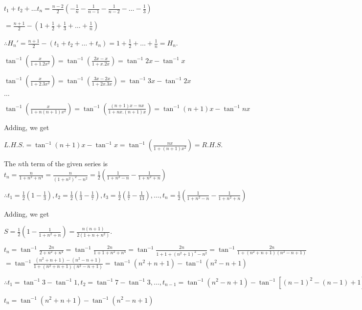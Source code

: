   $t_1 + t_2 + \ldots t_n = \frac{n - 2}{2}\left(-\frac{1}{n} - \frac{1}{n - 1} -\frac{1}{n - 2} -\ldots
  -\frac{1}{3}\right)$

  $= \frac{n + 1}{2} - \left(1 + \frac{1}{2} + \frac{1}{3} + \ldots + \frac{1}{n}\right)$

  $\therefore H_n' = \frac{n + 1}{2} - (t_1 + t_2 + \ldots + t_n) = 1 + \frac{1}{2} + \ldots + \frac{1}{n} =
  H_n$.
\item $\tan^{-1}\left(\frac{x}{1 + 1.2x^2}\right) = \tan^{-1}\left(\frac{2x - x}{1 + x. 2x}\right) =
  \tan^{-1}2x - \tan^{-1}x$

  $\tan^{-1}\left(\frac{x}{1 + 2.3x^2}\right) = \tan^{-1}\left(\frac{3x - 2x}{1 + 2x.3x}\right) =
  \tan^{-1}3x - \tan^{-1}2x$

  $\ldots$

  $\tan^{-1}\left(\frac{x}{1 + n(n + 1)x^2}\right) = \tan^{-1}\left(\frac{(n + 1)x - nx}{1 + nx.(n +
    1)x}\right) = \tan^{-1}(n + 1)x - \tan^{-1}nx$

  Adding, we get

  $L.H.S. = \tan^{-1}(n + 1)x - \tan^{-1}x = \tan^{-1}\left(\frac{nx}{1 + (n + 1)x^2}\right) = R.H.S.$
\item The $n$th term of the given series is
  $t_n = \frac{n}{1 + n^2 + n^4} = \frac{n}{(1 + n^2)^2 - n^2} = \frac{1}{2}\left(\frac{1}{1 + n^2 - n} -
  \frac{1}{1 + n^2 + n}\right)$

  $\therefore t_1 = \frac{1}{2}\left(1 - \frac{1}{3}\right), t_2 = \frac{1}{2}\left(\frac{1}{3} -
  \frac{1}{7}\right), t_3 = \frac{1}{2}\left(\frac{1}{7} - \frac{1}{13}\right), \ldots,t_n =
  \frac{1}{2}\left(\frac{1}{1 + n^2 - n} - \frac{1}{1 + n^2 + n}\right)$

  Adding, we get

  $S= \frac{1}{2}\left(1 - \frac{1}{1 + n^2 + n}\right) = \frac{n(n + 1)}{2(1 + n + n^2)}$.
\item $t_n = \tan^{-1}\frac{2n}{2 + n^2 + n^4} = \tan^{-1}\frac{2n}{1 + 1 + n^2 + n^4} =
  \tan^{-1}\frac{2n}{1 + 1 + (n^2 + 1)^2 - n^2} = \tan^{-1}\frac{2n}{1 + (n^2 + n + 1)(n^2 - n + 1)}$
  $= \tan^{-1}\frac{(n^2 + n + 1) - (n^2 - n + 1)}{1 + (n^2 + n + 1)(n^2 - n + 1)} = \tan^{-1}(n^2 + n + 1)
  - \tan^{-1}(n^2 - n + 1)$

  $\therefore t_1 = \tan^{-1}3 - \tan^{-1}1, t_2 = \tan^{-1}7 - \tan^{-1}3,\ldots,t_{n - 1} = \tan^{-1}(n^2
  -n + 1) - \tan^{-1}[(n - 1)^2 - (n - 1) + 1]$

  $t_n = \tan^{-1}(n^2 + n + 1) - \tan^{-1}(n^2 - n + 1)$

